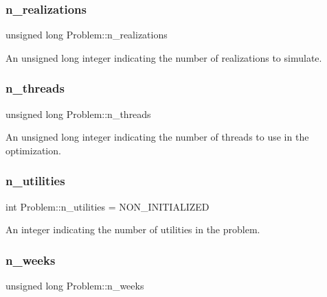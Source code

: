 \subsubsection{\texorpdfstring{n\+\_\+realizations}{n\_realizations}}
{\footnotesize\ttfamily unsigned long Problem\+::n\+\_\+realizations\hspace{0.3cm}{\ttfamily [protected]}}



An unsigned long integer indicating the number of realizations to simulate. 

\mbox{\label{classProblem_a3303a162d648e8ae16153b57b5b4054f}} 
\subsubsection{\texorpdfstring{n\+\_\+threads}{n\_threads}}
{\footnotesize\ttfamily unsigned long Problem\+::n\+\_\+threads\hspace{0.3cm}{\ttfamily [protected]}}



An unsigned long integer indicating the number of threads to use in the optimization. 

\mbox{\label{classProblem_a4ca86ba2f568d232cf0421d39acff113}} 
\subsubsection{\texorpdfstring{n\+\_\+utilities}{n\_utilities}}
{\footnotesize\ttfamily int Problem\+::n\+\_\+utilities = N\+O\+N\+\_\+\+I\+N\+I\+T\+I\+A\+L\+I\+Z\+ED\hspace{0.3cm}{\ttfamily [protected]}}



An integer indicating the number of utilities in the problem. 

\mbox{\label{classProblem_ac7513bb0ecdfa4bbb7d2ada3595d71ec}} 
\subsubsection{\texorpdfstring{n\+\_\+weeks}{n\_weeks}}
{\footnotesize\ttfamily unsigned long Problem\+::n\+\_\+weeks\hspace{0.3cm}{\ttfamily [protected]}}



